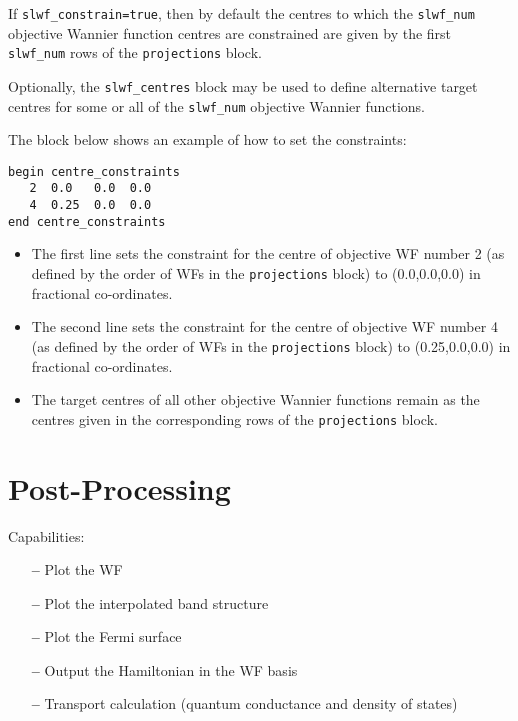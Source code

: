 If {\tt slwf\_constrain=true}, then by default the centres to which the {\tt slwf\_num} objective Wannier function centres are constrained are given by the first {\tt slwf\_num} rows of the {\tt projections} block. 

Optionally, the {\tt slwf\_centres} block may be used to define alternative target centres for some or all of the {\tt slwf\_num} objective Wannier functions.

The block below shows an example of how to set the constraints:

\noindent \verb#begin centre_constraints# \\
\verb#   2  0.0   0.0  0.0# \\
\verb#   4  0.25  0.0  0.0# \\
\verb#end centre_constraints#

\begin{itemize}
\item The first line sets the constraint for the centre of objective WF number 2 (as defined by the order of WFs in the {\tt projections} block) to (0.0,0.0,0.0) in fractional co-ordinates.
\item The second line sets the constraint for the centre of objective WF number 4 (as defined by the order of WFs in the {\tt projections} block) to (0.25,0.0,0.0) in fractional co-ordinates.
\item The target centres of all other objective Wannier functions remain as the centres given in the corresponding rows of the {\tt projections} block.
\end{itemize}

\section{Post-Processing}
\label{sec:post-p}

 Capabilities:

\begin{itemize}
\item[{\bf --}]  Plot the WF
\item[{\bf --}]  Plot the interpolated band structure
\item[{\bf --}]  Plot the Fermi surface
\item[{\bf --}]  Output the Hamiltonian in the WF basis
\item[{\bf --}]  Transport calculation (quantum conductance and
  density of states)
\end{itemize}



